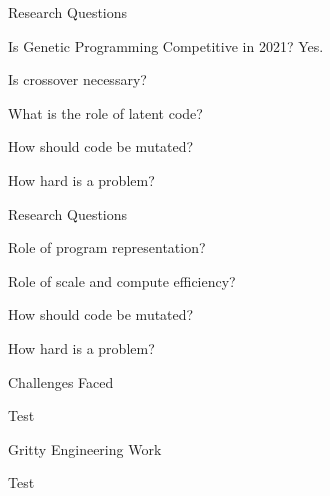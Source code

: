 \documentclass[aspectratio=169]{beamer}
\begin{document}
\begin{frame}{Research Questions}
  \begin{vfilleditems}
    \item {\Huge Is Genetic Programming Competitive in 2021? {\color{pureminimalistic@text@red} Yes.}}
    {\color{grey}
    \item {\Huge Is crossover necessary?}
    \item {\Huge What is the role of latent code?}
    \item {\Huge How should code be mutated?}
    \item {\Huge How hard is a problem?}
    }
  \end{vfilleditems}
\end{frame}

\begin{frame}{Research Questions}
  \begin{vfilleditems}
    \item {\Huge Role of program representation?}
    \item {\Huge Role of scale and compute efficiency?}
    \item {\Huge How should code be mutated?}
    \item {\Huge How hard is a problem?}
  \end{vfilleditems}
\end{frame}

\begin{frame}{Challenges Faced}
    \begin{vfilleditems}
    \item \Huge Test
    \end{vfilleditems}
\end{frame}

\begin{frame}{Gritty Engineering Work}
    \begin{vfilleditems}
    \item \Huge Test
    \end{vfilleditems}
\end{frame}
\end{document}
